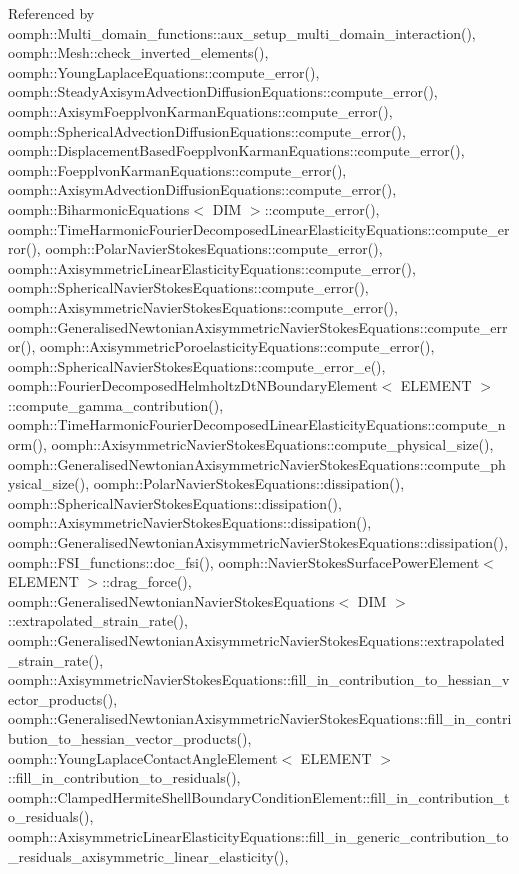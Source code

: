 Referenced by oomph\+::\+Multi\+\_\+domain\+\_\+functions\+::aux\+\_\+setup\+\_\+multi\+\_\+domain\+\_\+interaction(), oomph\+::\+Mesh\+::check\+\_\+inverted\+\_\+elements(), oomph\+::\+Young\+Laplace\+Equations\+::compute\+\_\+error(), oomph\+::\+Steady\+Axisym\+Advection\+Diffusion\+Equations\+::compute\+\_\+error(), oomph\+::\+Axisym\+Foepplvon\+Karman\+Equations\+::compute\+\_\+error(), oomph\+::\+Spherical\+Advection\+Diffusion\+Equations\+::compute\+\_\+error(), oomph\+::\+Displacement\+Based\+Foepplvon\+Karman\+Equations\+::compute\+\_\+error(), oomph\+::\+Foepplvon\+Karman\+Equations\+::compute\+\_\+error(), oomph\+::\+Axisym\+Advection\+Diffusion\+Equations\+::compute\+\_\+error(), oomph\+::\+Biharmonic\+Equations$<$ D\+I\+M $>$\+::compute\+\_\+error(), oomph\+::\+Time\+Harmonic\+Fourier\+Decomposed\+Linear\+Elasticity\+Equations\+::compute\+\_\+error(), oomph\+::\+Polar\+Navier\+Stokes\+Equations\+::compute\+\_\+error(), oomph\+::\+Axisymmetric\+Linear\+Elasticity\+Equations\+::compute\+\_\+error(), oomph\+::\+Spherical\+Navier\+Stokes\+Equations\+::compute\+\_\+error(), oomph\+::\+Axisymmetric\+Navier\+Stokes\+Equations\+::compute\+\_\+error(), oomph\+::\+Generalised\+Newtonian\+Axisymmetric\+Navier\+Stokes\+Equations\+::compute\+\_\+error(), oomph\+::\+Axisymmetric\+Poroelasticity\+Equations\+::compute\+\_\+error(), oomph\+::\+Spherical\+Navier\+Stokes\+Equations\+::compute\+\_\+error\+\_\+e(), oomph\+::\+Fourier\+Decomposed\+Helmholtz\+Dt\+N\+Boundary\+Element$<$ E\+L\+E\+M\+E\+N\+T $>$\+::compute\+\_\+gamma\+\_\+contribution(), oomph\+::\+Time\+Harmonic\+Fourier\+Decomposed\+Linear\+Elasticity\+Equations\+::compute\+\_\+norm(), oomph\+::\+Axisymmetric\+Navier\+Stokes\+Equations\+::compute\+\_\+physical\+\_\+size(), oomph\+::\+Generalised\+Newtonian\+Axisymmetric\+Navier\+Stokes\+Equations\+::compute\+\_\+physical\+\_\+size(), oomph\+::\+Polar\+Navier\+Stokes\+Equations\+::dissipation(), oomph\+::\+Spherical\+Navier\+Stokes\+Equations\+::dissipation(), oomph\+::\+Axisymmetric\+Navier\+Stokes\+Equations\+::dissipation(), oomph\+::\+Generalised\+Newtonian\+Axisymmetric\+Navier\+Stokes\+Equations\+::dissipation(), oomph\+::\+F\+S\+I\+\_\+functions\+::doc\+\_\+fsi(), oomph\+::\+Navier\+Stokes\+Surface\+Power\+Element$<$ E\+L\+E\+M\+E\+N\+T $>$\+::drag\+\_\+force(), oomph\+::\+Generalised\+Newtonian\+Navier\+Stokes\+Equations$<$ D\+I\+M $>$\+::extrapolated\+\_\+strain\+\_\+rate(), oomph\+::\+Generalised\+Newtonian\+Axisymmetric\+Navier\+Stokes\+Equations\+::extrapolated\+\_\+strain\+\_\+rate(), oomph\+::\+Axisymmetric\+Navier\+Stokes\+Equations\+::fill\+\_\+in\+\_\+contribution\+\_\+to\+\_\+hessian\+\_\+vector\+\_\+products(), oomph\+::\+Generalised\+Newtonian\+Axisymmetric\+Navier\+Stokes\+Equations\+::fill\+\_\+in\+\_\+contribution\+\_\+to\+\_\+hessian\+\_\+vector\+\_\+products(), oomph\+::\+Young\+Laplace\+Contact\+Angle\+Element$<$ E\+L\+E\+M\+E\+N\+T $>$\+::fill\+\_\+in\+\_\+contribution\+\_\+to\+\_\+residuals(), oomph\+::\+Clamped\+Hermite\+Shell\+Boundary\+Condition\+Element\+::fill\+\_\+in\+\_\+contribution\+\_\+to\+\_\+residuals(), oomph\+::\+Axisymmetric\+Linear\+Elasticity\+Equations\+::fill\+\_\+in\+\_\+generic\+\_\+contribution\+\_\+to\+\_\+residuals\+\_\+axisymmetric\+\_\+linear\+\_\+elasticity(), 